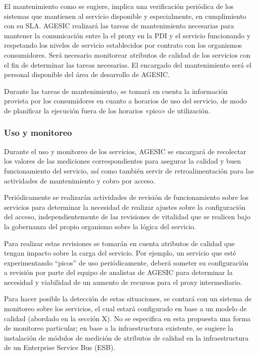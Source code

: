 \documentclass[11pt]{article}
\begin{document}
				El mantenimiento como se sugiere, implica una verificación periódica de los sistemas que mantienen al servicio disponible y especialmente, en cumplimiento con su SLA. AGESIC realizará las tareas de mantenimiento necesarias para mantener la comunicación entre la el proxy en la PDI y el servicio funcionando y respetando los niveles de servicio establecidos por contrato con los organismos consumidores. Será necesario monitorear atributos de calidad de los servicios con el fin de determinar las tareas necesarias. El encargado del mantenimiento será el personal disponible del área de desarrollo de AGESIC.

				Durante las tareas de mantenimiento, se tomará en cuenta la información provista por los consumidores en cuanto a horarios de uso del servicio, de modo de planificar la ejecución fuera de los horarios «pico» de utilización.

			\subsubsection{Uso y monitoreo}
				Durante el uso y monitoreo de los servicios, AGESIC se encargará de recolectar los valores de las mediciones correspondientes para asegurar la calidad y buen funcionamiento del servicio, así como también servir de retroalimentación para las actividades de mantenimiento y cobro por acceso.

				Periódicamente se realizarán actividades de revisión de funcionamiento sobre los servicios para determinar la necesidad de realizar ajustes sobre la configuración del acceso, independientemente de las revisiones de vitalidad que se realicen bajo la gobernanza del propio organismo sobre la lógica del servicio.

				Para realizar estas revisiones se tomarán en cuenta atributos de calidad que tengan impacto sobre la carga del servicio. Por ejemplo, un servicio que esté experimentando “picos” de uso periódicamente, deberá someter su configuración a revisión por parte del equipo de analistas de AGESIC para determinar la necesidad y viabilidad de un aumento de recursos para el proxy intermediario.

				Para hacer posible la detección de estas situaciones, se contará con un sistema de monitoreo sobre los servicios, el cual estará configurado en base a un modelo de calidad (abordado en la sección X). No se especifica en esta propuesta una forma de monitoreo particular; en base a la infraestructura existente, se sugiere la instalación de módulos de medición de atributos de calidad en la infraestructura de un Enterprise Service Bus (ESB).
\end{document}
